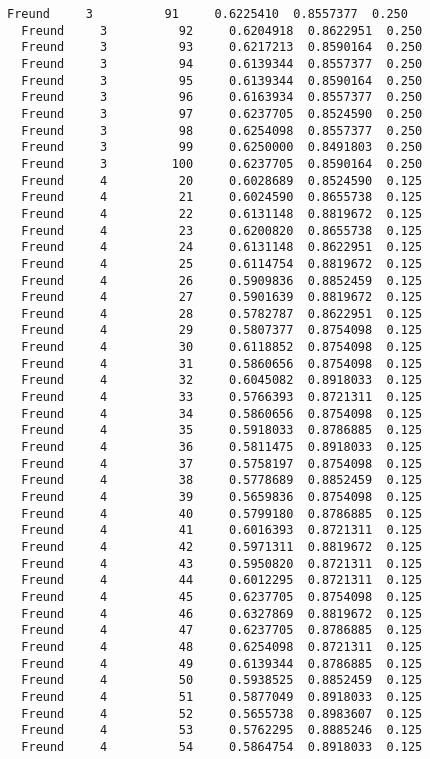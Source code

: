 \documentclass[11pt]{article}
\begin{document}
\begin{Verbatim}[commandchars=\\\{\}]
  Freund     3          91     0.6225410  0.8557377  0.250
  Freund     3          92     0.6204918  0.8622951  0.250
  Freund     3          93     0.6217213  0.8590164  0.250
  Freund     3          94     0.6139344  0.8557377  0.250
  Freund     3          95     0.6139344  0.8590164  0.250
  Freund     3          96     0.6163934  0.8557377  0.250
  Freund     3          97     0.6237705  0.8524590  0.250
  Freund     3          98     0.6254098  0.8557377  0.250
  Freund     3          99     0.6250000  0.8491803  0.250
  Freund     3         100     0.6237705  0.8590164  0.250
  Freund     4          20     0.6028689  0.8524590  0.125
  Freund     4          21     0.6024590  0.8655738  0.125
  Freund     4          22     0.6131148  0.8819672  0.125
  Freund     4          23     0.6200820  0.8655738  0.125
  Freund     4          24     0.6131148  0.8622951  0.125
  Freund     4          25     0.6114754  0.8819672  0.125
  Freund     4          26     0.5909836  0.8852459  0.125
  Freund     4          27     0.5901639  0.8819672  0.125
  Freund     4          28     0.5782787  0.8622951  0.125
  Freund     4          29     0.5807377  0.8754098  0.125
  Freund     4          30     0.6118852  0.8754098  0.125
  Freund     4          31     0.5860656  0.8754098  0.125
  Freund     4          32     0.6045082  0.8918033  0.125
  Freund     4          33     0.5766393  0.8721311  0.125
  Freund     4          34     0.5860656  0.8754098  0.125
  Freund     4          35     0.5918033  0.8786885  0.125
  Freund     4          36     0.5811475  0.8918033  0.125
  Freund     4          37     0.5758197  0.8754098  0.125
  Freund     4          38     0.5778689  0.8852459  0.125
  Freund     4          39     0.5659836  0.8754098  0.125
  Freund     4          40     0.5799180  0.8786885  0.125
  Freund     4          41     0.6016393  0.8721311  0.125
  Freund     4          42     0.5971311  0.8819672  0.125
  Freund     4          43     0.5950820  0.8721311  0.125
  Freund     4          44     0.6012295  0.8721311  0.125
  Freund     4          45     0.6237705  0.8754098  0.125
  Freund     4          46     0.6327869  0.8819672  0.125
  Freund     4          47     0.6237705  0.8786885  0.125
  Freund     4          48     0.6254098  0.8721311  0.125
  Freund     4          49     0.6139344  0.8786885  0.125
  Freund     4          50     0.5938525  0.8852459  0.125
  Freund     4          51     0.5877049  0.8918033  0.125
  Freund     4          52     0.5655738  0.8983607  0.125
  Freund     4          53     0.5762295  0.8885246  0.125
  Freund     4          54     0.5864754  0.8918033  0.125

\end{Verbatim}
\end{document}
